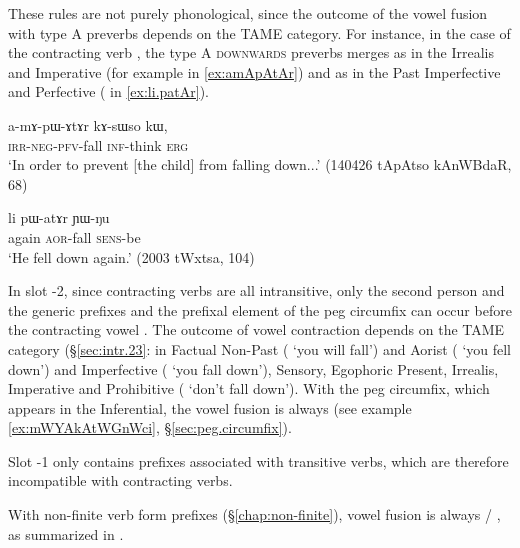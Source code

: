  These rules are not purely phonological, since the outcome of the vowel fusion with type A preverbs depends on the TAME category. For instance, in the case of the contracting verb , the type A \textsc{downwards}  preverbs merges as  in the Irrealis and Imperative (for example   in \ref{ex:amApAtAr}) and as  in the Past Imperfective and Perfective (  in \ref{ex:li.patAr}).
 
 \begin{exe}
 	\ex \label{ex:amApAtAr}
 	\gll   a-mɤ-pɯ-ɤtɤr kɤ-sɯso kɯ, \\
 	\textsc{irr}-\textsc{neg}-\textsc{pfv}-fall \textsc{inf}-think \textsc{erg} \\
 	\glt `In order to prevent [the child] from falling down...' (140426 tApAtso kAnWBdaR, 68)
 \end{exe}
 
 \begin{exe}
 	\ex \label{ex:li.patAr}
 	\gll li pɯ-atɤr ɲɯ-ŋu \\
 	again \textsc{aor}-fall \textsc{sens}-be \\
 	\glt `He fell down again.' (2003 tWxtsa, 104)
 \end{exe}
 
 In slot -2, since contracting verbs are all intransitive, only the second person  and the generic  prefixes and the prefixal element  of the peg circumfix can occur before the contracting vowel . The outcome of vowel contraction depends on the TAME category (§\ref{sec:intr.23}:   in Factual Non-Past ( `you will fall') and Aorist ( `you fell down') and    Imperfective ( `you fall down'), Sensory, Egophoric Present, Irrealis, Imperative and Prohibitive ( `don't fall down'). With the peg circumfix, which appears in the Inferential, the vowel fusion is always  (see example \ref{ex:mWYAkAtWGnWci}, §\ref{sec:peg.circumfix}).
 
 Slot -1 only contains prefixes associated with transitive verbs, which are therefore incompatible with contracting verbs.
 
 With non-finite verb form prefixes  (§\ref{chap:non-finite}),  vowel fusion is always  / , as summarized in .
 
